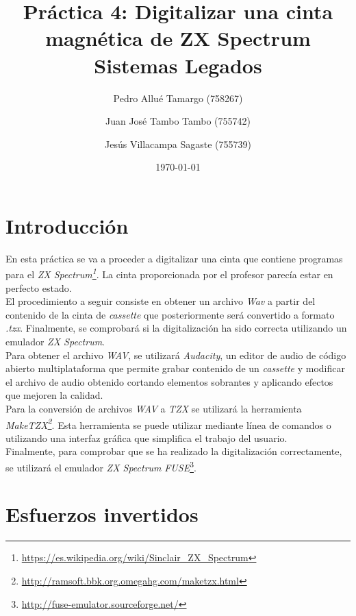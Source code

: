 \documentclass{article}
\begin{document}
\begin{titlepage}

\title{\textbf{
    {\Huge Práctica 4: Digitalizar una cinta magnética de ZX Spectrum}\\
    {\Large Sistemas Legados}
}}
\author{
    Pedro Allué Tamargo (758267)
    \and
    Juan José Tambo Tambo (755742)
    \and
    Jesús Villacampa Sagaste (755739)
}
\date{\today}
\clearpage\maketitle
\thispagestyle{empty}
\tableofcontents
\end{titlepage}

\section{Introducción}

En esta práctica se va a proceder a digitalizar una cinta que contiene programas para el \textit{ZX Spectrum\footnote{\url{https://es.wikipedia.org/wiki/Sinclair_ZX_Spectrum}}}. La cinta proporcionada por el profesor parecía estar en perfecto estado.\\

El procedimiento a seguir consiste en obtener un archivo \textit{Wav} a partir del contenido de la cinta de \textit{cassette} que posteriormente será convertido a formato \textit{.tzx}. Finalmente, se comprobará si la digitalización ha sido correcta utilizando un emulador \textit{ZX Spectrum}.\\

Para obtener el archivo \textit{WAV}, se utilizará \textit{Audacity}, un editor de audio de código abierto multiplataforma que permite grabar contenido de un \textit{cassette} y modificar el archivo de audio obtenido cortando elementos sobrantes y aplicando efectos que mejoren la calidad.\\
Para la conversión de archivos \textit{WAV} a \textit{TZX} se utilizará la herramienta \textit{MakeTZX\footnote{\url{http://ramsoft.bbk.org.omegahg.com/maketzx.html}}}. Esta herramienta se puede utilizar mediante línea de comandos o utilizando una interfaz gráfica que simplifica el trabajo del usuario.\\
Finalmente, para comprobar que se ha realizado la digitalización correctamente, se utilizará el emulador \textit{ZX Spectrum} \textit{FUSE}\footnote{\url{http://fuse-emulator.sourceforge.net/}}.


\section{Esfuerzos invertidos}
\end{document}
